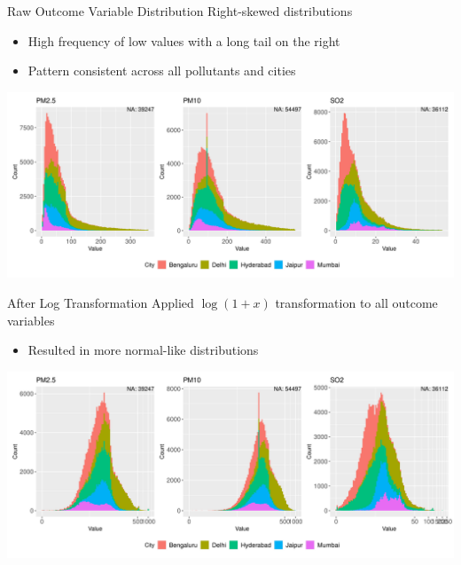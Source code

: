 \documentclass[svgnames, 12pt]{beamer}
\begin{document}
\begin{frame}{Raw Outcome Variable Distribution}
    Right-skewed distributions
    \begin{itemize}
        \item High frequency of low values with a long tail on the right
        \item Pattern consistent across all pollutants and cities
    \end{itemize}
    \vspace{1em}
    \begin{center}
        \includegraphics[width=\textwidth]{assets/skewness.png}
    \end{center}
    \vfill
\end{frame}

\begin{frame}{After Log Transformation}
    Applied $\log(1 + x)$ transformation to all outcome variables
    \begin{itemize}
        \item Resulted in more normal-like distributions
    \end{itemize}
    \vspace{1em}
    \begin{center}
        \includegraphics[width=\textwidth]{assets/log-scaled-pollutants.png}
    \end{center}
    \vfill
\end{frame}
\end{document}
